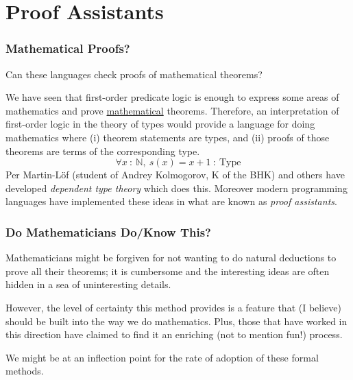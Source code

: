 \documentclass{beamer}
\theoremstyle{indentDefn} \newtheorem{defn}[]{Definition}
\begin{document}
\section{Proof Assistants}

\begin{frame}
  \frametitle{Mathematical Proofs?}

  Can these languages check proofs of mathematical theorems? 
  
  We have seen that first-order predicate logic is enough to express some areas of mathematics and prove \underline{mathematical} theorems. Therefore, an interpretation of first-order logic in the theory of types would provide a language for doing mathematics where (i) theorem statements are types, and (ii) proofs of those theorems are terms of the corresponding type. 
  $$\forall x \ : \ \mathbb{N}, \ s(x) = x + 1 \ : \ \text{Type}$$  %
  Per Martin-L\"{o}f (student of Andrey Kolmogorov, K of the BHK) and others have developed \emph{dependent type theory} which does this. Moreover modern programming languages have implemented these ideas in what are known as \emph{proof assistants}.


\end{frame}

\begin{frame}
  \frametitle{Do Mathematicians Do/Know This?}

  Mathematicians might be forgiven for not wanting to do natural deductions to prove all their theorems; it is cumbersome and the interesting ideas are often hidden in a sea of uninteresting details. 


  However, the level of certainty this method provides is a feature that (I believe) should be built into the way we do mathematics. Plus, those that have worked in this direction have claimed to find it an enriching (not to mention fun!) process. 

  We might be at an inflection point for the rate of adoption of these formal methods. 
  
  \vspace{40mm}
\end{frame}
\end{document}
